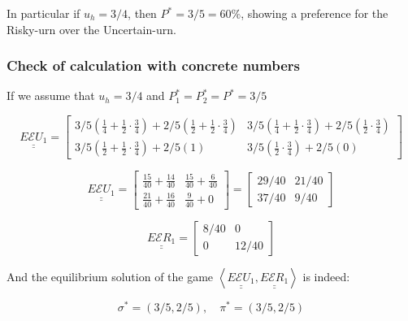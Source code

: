 \documentclass{article}
\theoremstyle{definition}
\begin{document}
In particular if $u_h=3/4$, then $P^* = 3/5 = 60\%$, showing a preference for the Risky-urn over the Uncertain-urn.

\subsubsection{Check of calculation with concrete numbers}

If we assume that $u_h=3/4$ and $P^*_1=P^*_2=P^*=3/5$

\begin{equation}
    \underline{\underline{E\mathcal{E}U_1}}
    =
    \begin{bmatrix}
    3/5 (\frac{1}{4}+\frac{1}{2} \cdot \frac{3}{4}) + 2/5 (\frac{1}{2}+\frac{1}{2} \cdot \frac{3}{4})  & 3/5 (\frac{1}{4}+\frac{1}{2} \cdot \frac{3}{4}) + 2/5 (\frac{1}{2} \cdot \frac{3}{4}) \\
    3/5 (\frac{1}{2}+\frac{1}{2} \cdot \frac{3}{4}) + 2/5 (1) & 3/5 (\frac{1}{2} \cdot \frac{3}{4}) + 2/5 (0) 
    \end{bmatrix}
\end{equation}

\begin{equation}
    \underline{\underline{E\mathcal{E}U_1}}
    =
    \begin{bmatrix}
    \frac{15}{40} + \frac{14}{40}  & \frac{15}{40} + \frac{6}{40} \\
    \frac{21}{40} + \frac{16}{40} & \frac{9}{40} + 0
    \end{bmatrix}
    =
    \begin{bmatrix}
    29/40 & 21/40  \\
    37/40 & 9/40
    \end{bmatrix}
\end{equation} 

\begin{equation}
    \underline{\underline{E\mathcal{E}R_1}}
    =
    \begin{bmatrix}
    8/40 & 0  \\
    0 & 12/40
    \end{bmatrix}
\end{equation} 

And the equilibrium solution of the game $\left\langle \underline{\underline{E\mathcal{E}U_1}}, \underline{\underline{E\mathcal{E}R_1}} \right\rangle$ is indeed:

\begin{equation}
    \sigma^* = (3/5, 2/5), \quad
    \pi^* = (3/5, 2/5)
\end{equation}
\end{document}
